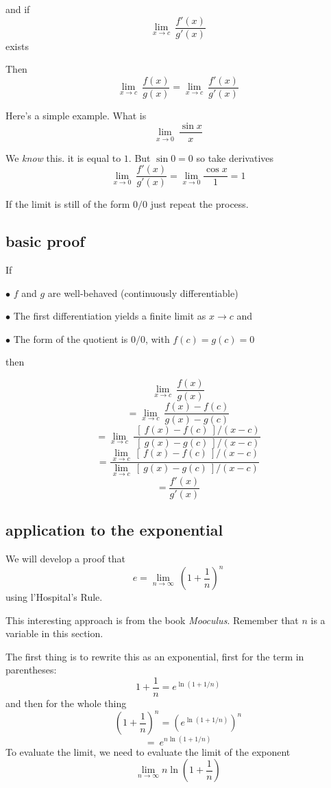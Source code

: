\documentclass[11pt, oneside]{article}
\begin{document}
and if 
\[ \lim_{x \rightarrow c} \ \frac{f'(x)}{g'(x)} \]
exists

Then
\[ \lim_{x \rightarrow c} \ \frac{f(x)}{g(x)} = \lim_{x \rightarrow c} \ \frac{f'(x)}{g'(x)} \]

Here's a simple example.  What is
\[ \lim_{x \rightarrow 0} \ \frac{\sin x}{x} \]

We \emph{know} this.  it is equal to $1$.  But $\sin 0 = 0$ so take derivatives
\[ \lim_{x \rightarrow 0} \ \frac{f'(x)}{g'(x)} = \lim_{x \rightarrow 0} \frac{\cos x}{1} = 1  \]

If the limit is still of the form $0/0$ just repeat the process.

\subsection*{basic proof}
If 

$\bullet$  $f$ and $g$ are well-behaved (continuously differentiable)

$\bullet$  The first differentiation yields a finite limit as $x \rightarrow c$ and

$\bullet$  The form of the quotient is $0/0$, with $f(c) = g(c) = 0$

then

\[ \lim_{x \rightarrow c} \ \frac{f(x)}{g(x)} \]
\[ = \lim_{x \rightarrow c} \ \frac{f(x) - f(c)}{g(x) - g(c)}  \]
\[ = \lim_{x \rightarrow c} \ \frac{\ [ \ f(x) - f(c) \ ] /(x-c)}{\ [ \ g(x) - g(c) \ ] / (x-c)}  \]
\[ = \frac{\lim_{x \rightarrow c} \ [ \ f(x) - f(c) \ ] /(x-c)}{\lim_{x \rightarrow c} \ [ \ g(x) - g(c) \ ] / (x-c)}  \]
\[ = \frac{f'(x)}{g'(x)} \]

\subsection*{application to the exponential}

We will develop a proof that
\[ e = \lim_{n \rightarrow \infty} \ (1 + \frac{1}{n})^n \]
using l'Hospital's Rule.

This interesting approach is from the book \emph{Mooculus}.  Remember that $n$ is a variable in this section.

The first thing is to rewrite this as an exponential, first for the term in parentheses:
\[ 1 + \frac{1}{n} = e^{\ln(1 + 1/n)} \]
and then for the whole thing
\[ (1 + \frac{1}{n})^n =  (e^{\ln(1 + 1/n)})^n \]
\[ = \ e^{n \ln(1 + 1/n)} \]
To evaluate the limit, we need to evaluate the limit of the exponent
\[ \lim_{n \rightarrow \infty} n   \ln (1 + \frac{1}{n})  \]
\end{document}
